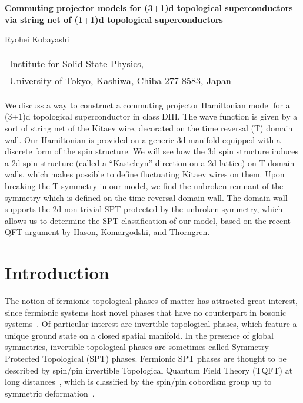 \documentclass[12pt]{article}
\numberwithin{equation}{section}
\begin{document}
\begin{center}

{\large \bfseries Commuting projector models for (3+1)d topological superconductors via string net of (1+1)d topological superconductors}

\bigskip
\bigskip
\bigskip

Ryohei Kobayashi
\bigskip
\bigskip
\bigskip

\begin{tabular}{ll}
 Institute for Solid State Physics, \\
University of Tokyo, Kashiwa, Chiba 277-8583, Japan\\

\end{tabular}


\vskip 1cm

\end{center}


\noindent 
We discuss a way to construct a commuting projector Hamiltonian model for a (3+1)d topological superconductor in class DIII.
The wave function is given by a sort of string net of the Kitaev wire, decorated on the time reversal (T) domain wall.
Our Hamiltonian is provided on a generic 3d manifold equipped with a discrete form of the spin structure.
We will see how the 3d spin structure induces a 2d spin structure (called a “Kasteleyn” direction on a 2d lattice) on T domain walls, which makes possible to define fluctuating Kitaev wires on them.
Upon breaking the T symmetry in our model, we find the unbroken remnant of the symmetry which is defined on the time reversal domain wall.
The domain wall supports the 2d non-trivial SPT protected by the unbroken symmetry, which allows us to determine the SPT classification of our model,
based on the recent QFT argument by Hason, Komargodski, and Thorngren.



\setcounter{tocdepth}{2}
\tableofcontents

\section{Introduction}

The notion of fermionic topological phases of matter has attracted great interest, since fermionic systems host novel phases that have no counterpart in bosonic systems~\cite{Gu:2012ib, Wang2017Interacting, Witten2016Fermion, Metlitski2014, Cheng2018Classification, Gu2014Lattice, Guo:2018vij, Gaiotto:2015zta}. Of particular interest are invertible topological phases, which feature a unique ground state on a closed spatial manifold. 
In the presence of global symmetries, invertible topological phases are sometimes called Symmetry Protected Topological (SPT) phases. Fermionic SPT phases are thought to be described by spin/pin invertible Topological Quantum Field Theory (TQFT) at long distances~\cite{Gaiotto:2015zta, Bhardwaj2017Statesum, Bhardwaj2017, Turzillo2018, Kobayashi2019pin}, which is classified by the spin/pin cobordism group up to symmetric deformation~\cite{Kapustin:2014dxa, Freed:2016rqq, Yonekura:2018ufj}.
\end{document}
